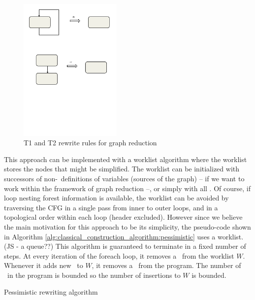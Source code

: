 \begin{figure}
\includegraphics[width=5cm]{t1_t2_transforms.pdf}
\caption{\label{fig:t1t2transforms}T1 and T2 rewrite rules for graph reduction}
\end{figure}

This approach can be implemented with 
a worklist algorithm where the worklist stores the nodes
that might be simplified. The worklist can be initialized with
successors of non-\phiop\ definitions of variables (sources of the
graph) -- if we want to work within the framework of graph reduction --,
or simply with all \phiops. Of course, if loop nesting forest
information is available, 
the worklist can be avoided by traversing the CFG in a single pass 
from inner to outer loops, and in a topological order within each loop (header excluded).
However since we believe the main motivation for this approach to be its
simplicity,
the pseudo-code shown in Algorithm 
\ref{alg:classical_construction_algorithm:pessimistic} uses a worklist.
(JS - a queue??)
This algorithm is guaranteed to terminate in a fixed number of steps.
At every iteration of the foreach loop, it removes a \phiop\ from the
worklist
$W$. Whenever it adds new \phiops\ to $W$, it removes a \phiop\ from
the program.
The number of \phiops\ in 
the program is bounded so the number of insertions to $W$ is bounded.

\begin{algorithm}
\caption{\label{alg:classical_construction_algorithm:pessimistic}
Pessimistic rewriting algorithm}
\end{algorithm}


